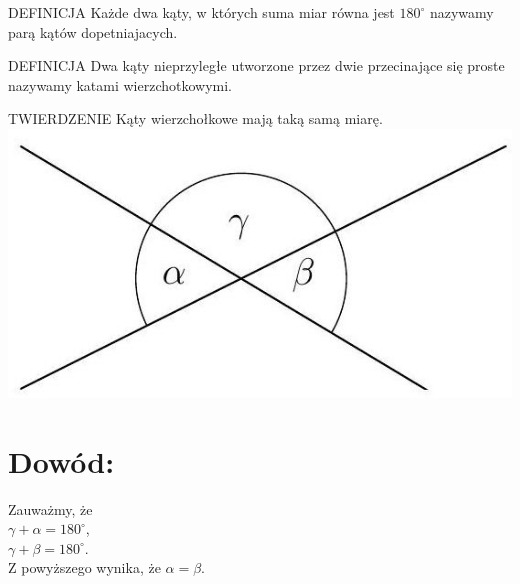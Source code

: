 \documentclass[10pt]{article}
\begin{document}
DEFINICJA Każde dwa kąty, w których suma miar równa jest \(180^{\circ}\) nazywamy parą kątów dopetniajacych.

DEFINICJA Dwa kąty nieprzyległe utworzone przez dwie przecinające się proste nazywamy katami wierzchotkowymi.

TWIERDZENIE Kąty wierzchołkowe mają taką samą miarę.\\
\includegraphics[max width=\textwidth, center]{2024_11_21_71f62bd117d375398909g-009(3)}

\section*{Dowód:}
Zauważmy, że\\
\(\gamma+\alpha=180^{\circ}\),\\
\(\gamma+\beta=180^{\circ}\).\\
Z powyższego wynika, że \(\alpha=\beta\).
\end{document}
